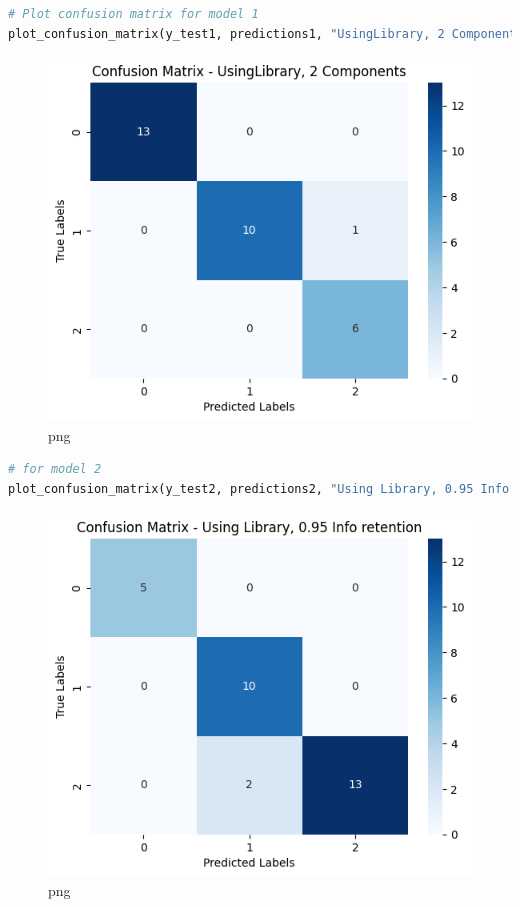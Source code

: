 \documentclass[
]{article}
\begin{document}
\begin{lstlisting}[language=Python]
# Plot confusion matrix for model 1
plot_confusion_matrix(y_test1, predictions1, "UsingLibrary, 2 Components")
\end{lstlisting}

\begin{figure}
\centering
\includegraphics{PCA on IRIS_files/PCA on IRIS_67_0.png}
\caption{png}
\end{figure}

\begin{lstlisting}[language=Python]
# for model 2
plot_confusion_matrix(y_test2, predictions2, "Using Library, 0.95 Info retention")
\end{lstlisting}

\begin{figure}
\centering
\includegraphics{PCA on IRIS_files/PCA on IRIS_68_0.png}
\caption{png}
\end{figure}
\end{document}
